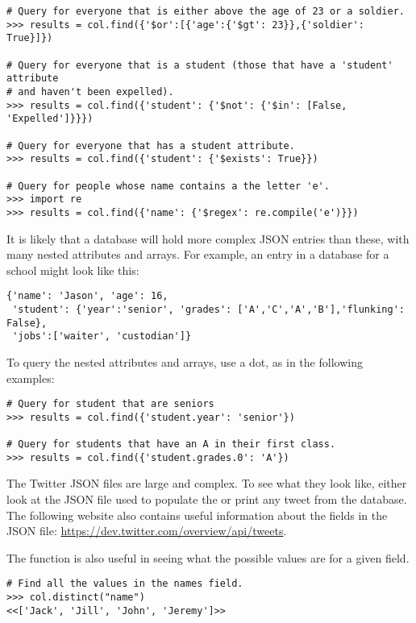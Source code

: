 \begin{lstlisting}
# Query for everyone that is either above the age of 23 or a soldier.
>>> results = col.find({'$or':[{'age':{'$gt': 23}},{'soldier': True}]})

# Query for everyone that is a student (those that have a 'student' attribute
# and haven't been expelled).
>>> results = col.find({'student': {'$not': {'$in': [False, 'Expelled']}}})

# Query for everyone that has a student attribute.
>>> results = col.find({'student': {'$exists': True}})

# Query for people whose name contains a the letter 'e'.
>>> import re
>>> results = col.find({'name': {'$regex': re.compile('e')}})
\end{lstlisting}

It is likely that a database will hold more complex JSON entries than these, with many nested attributes and arrays.
For example, an entry in a database for a school might look like this:

\begin{lstlisting}
{'name': 'Jason', 'age': 16,
 'student': {'year':'senior', 'grades': ['A','C','A','B'],'flunking': False},
 'jobs':['waiter', 'custodian']}
\end{lstlisting}

To query the nested attributes and arrays, use a dot, as in the following examples:

\begin{lstlisting}
# Query for student that are seniors
>>> results = col.find({'student.year': 'senior'})

# Query for students that have an A in their first class.
>>> results = col.find({'student.grades.0': 'A'})
\end{lstlisting}

The Twitter JSON files are large and complex.
To see what they look like, either look at the JSON file used to populate the  or print any tweet from the database.
The following website also contains useful information about the fields in the JSON file: \url{https://dev.twitter.com/overview/api/tweets}.

The  function is also useful in seeing what the possible values are for a given field.

\begin{lstlisting}
# Find all the values in the names field.
>>> col.distinct("name")
<<['Jack', 'Jill', 'John', 'Jeremy']>>
\end{lstlisting}

